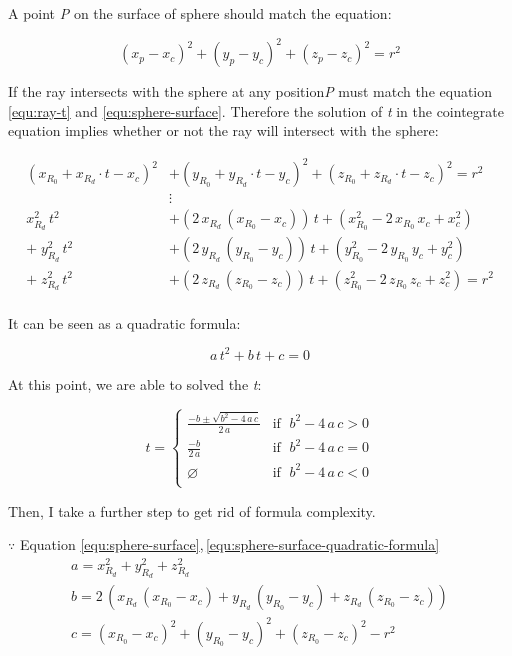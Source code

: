 A point \emph{P} on the surface of sphere should match the equation:

\begin{equation}
\label{equ:sphere-surface}
(x_p - x_c)^2 + (y_p - y_c)^2 + (z_p - z_c)^2 = r^2
\end{equation}

If the ray intersects with the sphere at any position\;\emph{P} must match the equation \ref{equ:ray-t} and \ref{equ:sphere-surface}. Therefore the solution of \emph{t} in the cointegrate equation implies whether or not the ray will intersect with the sphere:

\[
\begin{aligned}
(x_{R_0} + x_{R_d} \cdot t - x_c)^2 &+ (y_{R_0} + y_{R_d} \cdot t - y_c)^2 + (z_{R_0} + z_{R_d} \cdot t - z_c)^2 = r^2\\
&\vdots\\
x_{R_d}^2\,t^2 &+ (2\,x_{R_d}\,(x_{R_0} - x_c))\,t + (x_{R_0}^2 - 2\,x_{R_0}\,x_c + x_c^2)\\
+\;y_{R_d}^2\,t^2 &+ (2\,y_{R_d}\,(y_{R_0} - y_c))\,t + (y_{R_0}^2 - 2\,y_{R_0}\,y_c + y_c^2)\\
+\;z_{R_d}^2\,t^2 &+ (2\,z_{R_d}\,(z_{R_0} - z_c))\,t + (z_{R_0}^2 - 2\,z_{R_0}\,z_c + z_c^2) = r^2\\
\end{aligned}
\]

It can be seen as a quadratic formula:

\begin{equation}
\label{equ:sphere-surface-quadratic-formula}
a\,t^2 + b\,t + c = 0
\end{equation}

At this point, we are able to solved the \emph{t}:

\[
t =
\begin{cases}
\frac{-b \pm \sqrt{b^2 - 4\,a\,c}}{2\,a} & \text{if }\;b^2 - 4\,a\,c > 0\\
\frac{-b}{2\,a} & \text{if }\; b^2 - 4\,a\,c = 0\\
\varnothing & \text{if }\; b^2 - 4\,a\,c < 0\\
\end{cases}
\]

Then, I take a further step to get rid of formula complexity.

$\because$ Equation \ref{equ:sphere-surface},\,\ref{equ:sphere-surface-quadratic-formula}
\[
\begin{array}{lr}
a = x_{R_d}^2 + y_{R_d}^2 + z_{R_d}^2\\
b = 2\,(x_{R_d}\,(x_{R_0} - x_c) + y_{R_d}\,(y_{R_0} - y_c) + z_{R_d}\,(z_{R_0} - z_c))\\
c = (x_{R_0} - x_c)^2 + (y_{R_0} - y_c)^2 + (z_{R_0} - z_c)^2 - r^2\\
\end{array}
\]

